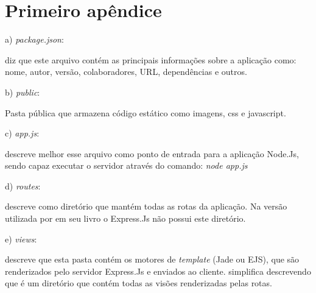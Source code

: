 \setcounter{figure}{0}

\chapter{Primeiro apêndice}
\label{apend:express-skel}

\vspace{-1.9cm}

\begin{compactitem}
  \item[a)] \textit{package.json}:
  
   diz que este arquivo contém as principais informações sobre a aplicação como: 
  nome, autor, versão, colaboradores, URL, dependências e outros.
  
  \item[b)] \textit{public}:
  
  Pasta pública que armazena código estático como imagens, css e javascript. \cite{pereira}
  
  \item[c)] \textit{app.js}:
  
   descreve melhor esse arquivo como ponto de entrada para a aplicação Node.Js, 
  sendo capaz executar o servidor através do comando: \textit{node app.js}
  
  \item[d)] \textit{routes}:
  
   descreve como diretório que mantém todas as rotas da aplicação. 
  Na versão utilizada por  em seu livro o Express.Js não possui este diretório.
  
  \item[e)] \textit{views}: 
  
   descreve que esta pasta contém os motores de \textit{template} (Jade ou EJS), 
  que são renderizados pelo servidor Express.Js e enviados ao cliente. 
  simplifica descrevendo que é um diretório que contém todas as visões renderizadas pelas rotas.
  
\end{compactitem}